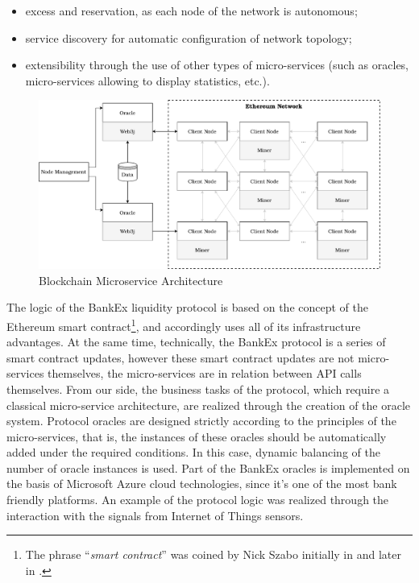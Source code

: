 \documentclass{article}
\begin{document}
\begin{multicols}{2}
\begin{itemize}
\item excess and reservation, as each node of the network is autonomous;
\item service discovery for automatic configuration of network topology;
\item extensibility through the use of other types of micro-services (such as oracles, micro-services allowing to display statistics, etc.).
\end{itemize}

\begin{figure}
  \centering
  \includegraphics[width=\textwidth]{blockchain-microservice-architecture.pdf}
  \caption{Blockchain Microservice Architecture}
  \label{fig:blockchain-microservice-architecture}
\end{figure}

The logic of the BankEx liquidity protocol is based on the concept of the Ethereum smart contract\footnote{The phrase \enquote{\textit{smart contract}} was coined by Nick Szabo initially in \cite{szabo1996} and later in \cite{szabo1997}.}, and accordingly uses all of its infrastructure advantages. At the same time, technically, the BankEx protocol is a series of smart contract updates, however these smart contract updates are not micro-services themselves, the micro-services are in relation between API calls themselves. From our side, the business tasks of the protocol, which require a classical micro-service architecture, are realized through the creation of the oracle system. Protocol oracles are designed strictly according to the principles of the micro-services, that is, the instances of these oracles should be automatically added under the required conditions. In this case, dynamic balancing of the number of oracle instances is used. Part of the BankEx oracles is implemented on the basis of Microsoft Azure cloud technologies, since it's one of the most bank friendly platforms. An example of the protocol logic was realized through the interaction with the signals from Internet of Things sensors.


\end{multicols}
\end{document}
